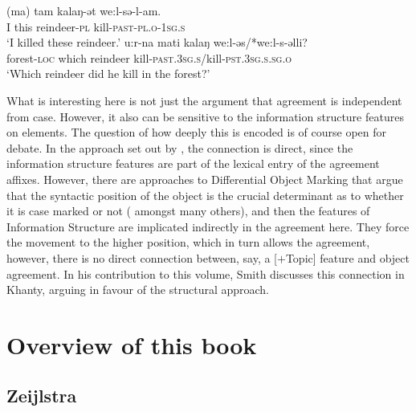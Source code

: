 \documentclass[output=paper
,modfonts
,nonflat]{langsci/langscibook}
\begin{document}
\begin{exe}
	\ex
	\begin{xlist}
		\ex
		\gll (ma) tam kalaŋ-ət we:l-sə-l-am.\\
		I this reindeer-\textsc{pl} kill-\textsc{past-pl.o-1sg.s}\\
		\glt ‘I killed these reindeer.’
		\ex
		\gll u:r-na mati kalaŋ we:l-əs/*we:l-s-əlli?\\
		forest-\textsc{loc} which reindeer kill-\textsc{past.3sg.s}/kill-\textsc{pst.3sg.s.sg.o}\\
		\glt `Which reindeer did he kill in the forest?'
	\end{xlist}
\end{exe}
What is interesting here is not just the argument that agreement is independent from case.
However, it also can be sensitive to the information structure features on elements.
The question of how deeply this is encoded is of course open for debate.
In the approach set out by \citet{dn2011}, the connection is direct, since the information structure features are part of the lexical entry of the agreement affixes.
However, there are approaches to Differential Object Marking that argue that the syntactic position of the object is the crucial determinant as to whether it is case marked or not (\citealp{woolford1999,woolford2001,Baker2015} amongst many others), and then the features of Information Structure are implicated indirectly in the agreement here.
They force the movement to the higher position, which in turn allows the agreement, however, there is no direct connection between, say, a [$+$Topic] feature and object agreement.
In his contribution to this volume, Smith discusses this connection in Khanty, arguing in favour of the structural approach.

\section{Overview of this book}
\label{secchapteroverviews}

\subsection{Zeijlstra}
\label{sec:zeiljstra}
\end{document}
